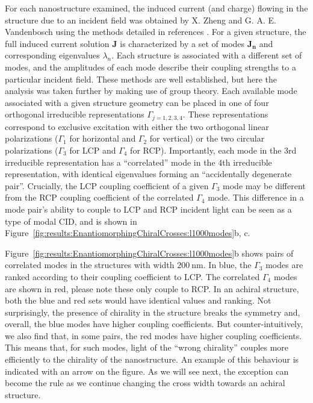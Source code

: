 For each nanostructure examined, the induced current (and charge) flowing in the structure due to an incident field was obtained by X. Zheng and G. A. E. Vandenbosch using the methods detailed in references \cite{Collins2018, Zheng2012}. For a given structure, the full induced current solution $\mathbf{J}$ is characterized by a set of modes $\mathbf{J_n}$ and corresponding eigenvalues $\lambda_{n}$. Each structure is associated with a different set of modes, and the amplitudes of each mode describe their coupling strengths to a particular incident field.
These methods are well established, but here the analysis was taken further by making use of group theory. Each available mode associated with a given structure geometry can be placed in one of four orthogonal irreducible representations $\Gamma _{j = 1,2,3,4}$. These representations correspond to exclusive excitation with either the two orthogonal linear polarizations ($\Gamma _{1}$ for horizontal and $\Gamma _{2}$ for vertical) or the two circular polarizations ($\Gamma _{3}$ for LCP and $\Gamma _{4}$ for RCP). 
Importantly, each mode in the 3rd irreducible representation has a “correlated” mode in the 4th irreducible representation, with identical eigenvalues forming an ``accidentally degenerate pair''. 
Crucially, the LCP coupling coefficient of a given $\Gamma _{3}$ mode may be different from the RCP coupling coefficient of the correlated $\Gamma _{4}$ mode. 
This difference in a mode pair's ability to couple to LCP and RCP incident light can be seen as a type of modal CID, and is shown in Figure~\ref{fig:results:EnantiomorphingChiralCrosses:l1000modes}b, c. 

Figure~\ref{fig:results:EnantiomorphingChiralCrosses:l1000modes}b shows pairs of correlated modes in the structures with width $\SI{200}{\nano\m}$. In blue, the $\Gamma _{3}$ modes are ranked according to their coupling coefficient to LCP. The correlated $\Gamma _{4}$ modes are shown in red, please note these only couple to RCP. In an achiral structure, both the blue and red sets would have identical values and ranking. Not surprisingly, the presence of chirality in the structure breaks the symmetry and, overall, the blue modes have higher coupling coefficients. 
But counter-intuitively, we also find that, in some pairs, the red modes have higher coupling coefficients. This means that, for such modes, light of the ``wrong chirality'' couples more efficiently to the chirality of the nanostructure. An example of this behaviour is indicated with an arrow on the figure. As we will see next, the exception can become the rule as we continue changing the cross width towards an achiral structure.

